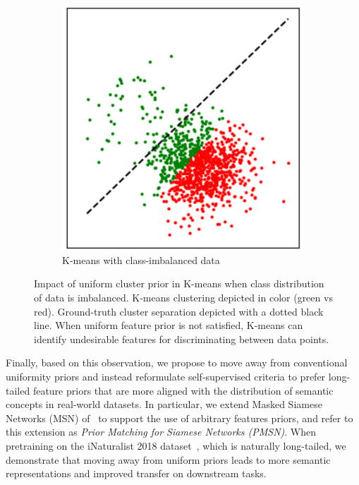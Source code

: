\documentclass{article} %
\begin{document}
\begin{figure}
\begin{subfigure}{\linewidth}
        \includegraphics[width=\linewidth]{assets/kmeans_0.95.pdf}
        \caption{K-means with class-imbalanced data}
        \label{fig:visu_rcdm_unbalanced}
    \end{subfigure}
    \caption{Impact of uniform cluster prior in K-means when class distribution of data is imbalanced.  K-means clustering depicted in color (green vs red). Ground-truth cluster separation depicted with a dotted black line. When uniform feature prior is not satisfied, K-means can identify undesirable features for discriminating between data points.}
    \label{fig:kmeans}
\end{figure}

Finally, based on this observation, we propose to move away from conventional uniformity priors and instead reformulate self-supervised criteria to prefer long-tailed feature priors that are more aligned with the distribution of semantic concepts in real-world datasets.
In particular, we extend Masked Siamese Networks (MSN) of~\citet{assran2022masked} to support the use of arbitrary features priors, and refer to this extension as  {\em Prior Matching for Siamese Networks (PMSN)}. 
When pretraining on the iNaturalist 2018 dataset~\citep{van2018inaturalist}, which is naturally long-tailed, we demonstrate that moving away from uniform priors leads to more semantic representations and improved transfer on downstream tasks.
\end{document}
